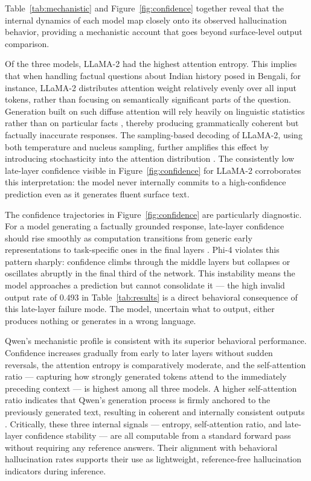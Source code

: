 \documentclass[conference]{IEEEtran}
\begin{document}
Table~\ref{tab:mechanistic} and Figure~\ref{fig:confidence} together 
reveal that the internal dynamics of each model map closely onto its 
observed hallucination behavior, providing a mechanistic account 
that goes beyond surface-level output comparison.

Of the three models, LLaMA-2 had the highest attention entropy. 
This implies that when handling factual questions about Indian 
history posed in Bengali, for instance, LLaMA-2 distributes attention 
weight relatively evenly over all input tokens, rather than focusing 
on semantically significant parts of the question. Generation built 
on such diffuse attention will rely heavily on linguistic statistics 
rather than on particular facts \cite{b21}, thereby producing 
grammatically coherent but factually inaccurate responses. The 
sampling-based decoding of LLaMA-2, using both temperature and nucleus 
sampling, further amplifies this effect by introducing stochasticity 
into the attention distribution \cite{b30}. The consistently low 
late-layer confidence visible in Figure~\ref{fig:confidence} for 
LLaMA-2 corroborates this interpretation: the model never internally 
commits to a high-confidence prediction even as it generates fluent 
surface text.

The confidence trajectories in Figure~\ref{fig:confidence} are 
particularly diagnostic. For a model generating a factually grounded 
response, late-layer confidence should rise smoothly as computation 
transitions from generic early representations to task-specific 
ones in the final layers \cite{b28}. Phi-4 violates this pattern 
sharply: confidence climbs through the middle layers but collapses 
or oscillates abruptly in the final third of the network. This 
instability means the model approaches a prediction but cannot 
consolidate it — the high invalid output rate of 0.493 in 
Table~\ref{tab:results} is a direct behavioral consequence of this 
late-layer failure mode. The model, uncertain what to output, 
either produces nothing or generates in a wrong language.

Qwen's mechanistic profile is consistent with its superior 
behavioral performance. Confidence increases gradually from early 
to later layers without sudden reversals, the attention entropy is 
comparatively moderate, and the self-attention ratio — capturing 
how strongly generated tokens attend to the immediately preceding 
context — is highest among all three models. A higher self-attention 
ratio indicates that Qwen's generation process is firmly anchored 
to the previously generated text, resulting in coherent and internally 
consistent outputs \cite{b29}. Critically, these three internal 
signals — entropy, self-attention ratio, and late-layer confidence 
stability — are all computable from a standard forward pass without 
requiring any reference answers. Their alignment with behavioral 
hallucination rates supports their use as lightweight, reference-free 
hallucination indicators during inference.
\end{document}
